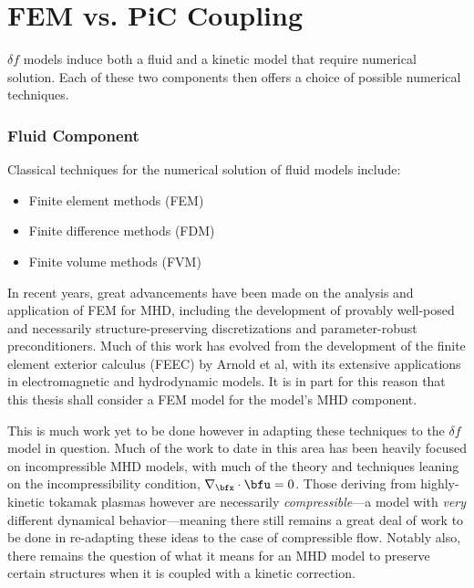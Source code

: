 \section{FEM vs. PiC Coupling}
    $\delta\! f$ models induce both a fluid and a kinetic model that require numerical solution. Each of these two components then offers a choice of possible numerical techniques.

    
    \line
    
    \subsubsection*{Fluid Component}

    Classical techniques for the numerical solution of fluid models include:
    \begin{itemize}
        \item  Finite element methods (FEM)
        \item  Finite difference methods (FDM)
        \item  Finite volume methods (FVM)
    \end{itemize}
    In recent years, great advancements have been made on the analysis and application of FEM for MHD, including the development of provably well-posed and necessarily structure-preserving discretizations and parameter-robust preconditioners. \cite{Hu_Xu_2015, Hu_Ma_Yu_2017, Hu_Lee_Xu_2021, Green_et_al_2022, LFM22, LHF22} Much of this work has evolved from the development of the finite element exterior calculus (FEEC) by Arnold et al, with its extensive applications in electromagnetic and hydrodynamic models. \cite{Arnold_Falk_Winther_2006, Arnold_Falk_Winther_2009, Arnold_2018} It is in part for this reason that this thesis shall consider a FEM model for the model's MHD component. 

    This is much work yet to be done however in adapting these techniques to the $\delta\! f$ model in question. Much of the work to date in this area has been heavily focused on incompressible MHD models, with much of the theory and techniques leaning on the incompressibility condition, $\nabla_{\bfx}\cdot\bfu  =  0$. Those deriving from highly-kinetic tokamak plasmas however are necessarily \emph{compressible}---a model with \emph{very} different dynamical behavior---meaning there still remains a great deal of work to be done in re-adapting these ideas to the case of compressible flow. Notably also, there remains the question of what it means for an MHD model to preserve certain structures when it is coupled with a kinetic correction.

